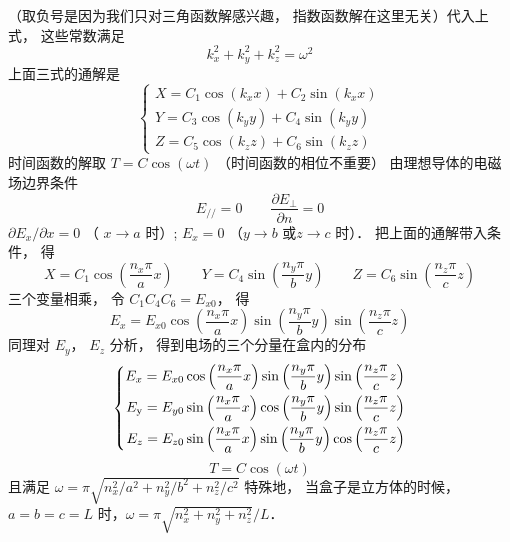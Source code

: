 （取负号是因为我们只对三角函数解感兴趣， 指数函数解在这里无关）代入上式， 这些常数满足
\begin{equation}
k_x^2 + k_y^2 + k_z^2 = {\omega ^2}
\end{equation} 
上面三式的通解是
\begin{equation}
\left\{ \begin{array}{l}
X = {C_1}\cos \left( {{k_x}x} \right) + {C_2}\sin \left( {{k_x}x} \right)\\
Y = {C_3}\cos \left( {{k_y}y} \right) + {C_4}\sin \left( {{k_y}y} \right)\\
Z = {C_5}\cos \left( {{k_z}z} \right) + {C_6}\sin \left( {{k_z}z} \right)
\end{array} \right.
\end{equation} 
时间函数的解取 $T = C\cos \left( {\omega t} \right)$ （时间函数的相位不重要）
由理想导体的电磁场边界条件%
\begin{equation}
{E_{//}} = 0
\qquad
 \frac{{\partial {E_ \bot }}}{{\partial n}} = 0
\end{equation}  
 ${{\partial {E_x}}}/{{\partial x}} = 0$ （ $x \to a$ 时）;  ${E_x} = 0$ （$y \to b$ 或$z \to c$ 时）． 把上面的通解带入条件， 得
\begin{equation}
X = {C_1}\cos \left( {\frac{{{n_x}\pi }}{a}x} \right)
\qquad
Y = {C_4}\sin \left( {\frac{{{n_y}\pi }}{b}y} \right)
\qquad
Z = {C_6}\sin \left( {\frac{{{n_z}\pi }}{c}z} \right)
\end{equation}  
三个变量相乘， 令 ${C_1}{C_4}{C_6} = {E_{x0}}$，  得
\begin{equation}
{E_x} = {E_{x0}}\cos \left( {\frac{{{n_x}\pi }}{a}x} \right)\sin \left( {\frac{{{n_y}\pi }}{b}y} \right)\sin \left( {\frac{{{n_z}\pi }}{c}z} \right)
\end{equation} 
同理对 ${E_y}$，  ${E_z}$ 分析， 得到电场的三个分量在盒内的分布
\begin{equation}
\left\{ \begin{aligned}
{E_x} = {E_{x0}}\cos \left( {\frac{{{n_x}\pi }}{a}x} \right)\sin \left( {\frac{{{n_y}\pi }}{b}y} \right)\sin \left( {\frac{{{n_z}\pi }}{c}z} \right)\\
{E_{\rm{y}}} = {E_{y0}}\sin \left( {\frac{{{n_x}\pi }}{a}x} \right)\cos \left( {\frac{{{n_y}\pi }}{b}y} \right)\sin \left( {\frac{{{n_z}\pi }}{c}z} \right)\\
{E_z} = {E_{z0}}\sin \left( {\frac{{{n_x}\pi }}{a}x} \right)\sin \left( {\frac{{{n_y}\pi }}{b}y} \right)\cos \left( {\frac{{{n_z}\pi }}{c}z} \right)
\end{aligned} \right.
\end{equation} 
\begin{equation}
T = C\cos \left( {\omega t} \right)
\end{equation}
且满足 $\omega  = \pi \sqrt {{{n_x^2}/}{{{a^2}}} + {{n_y^2}}/{{{b^2}}} + {{n_z^2}}/{{{c^2}}}} $
特殊地， 当盒子是立方体的时候， $a = b = c = L$ 时，$\omega  = {\pi }\sqrt {n_x^2 + n_y^2 + n_z^2}/L $．   




